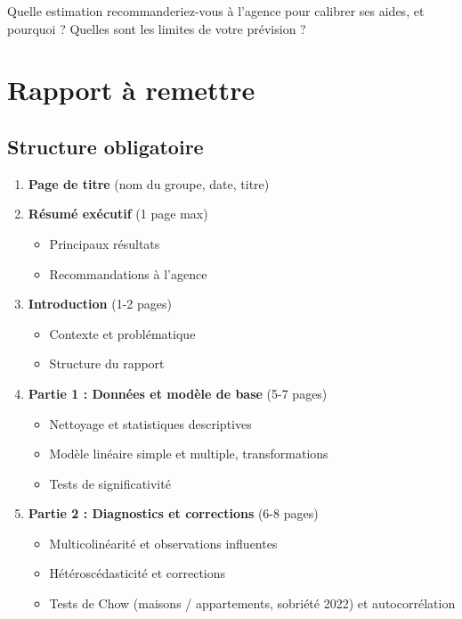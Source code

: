 \documentclass[11pt,a4paper]{article}
\begin{document}
\begin{question}
Quelle estimation recommanderiez-vous à l'agence pour calibrer ses aides, et pourquoi ? Quelles sont les limites de votre prévision ?
\end{question}

\newpage
\section*{Rapport à remettre}

\subsection*{Structure obligatoire}
\begin{enumerate}
  \item \textbf{Page de titre} (nom du groupe, date, titre)
  \item \textbf{Résumé exécutif} (1 page max)
    \begin{itemize}
      \item Principaux résultats
      \item Recommandations à l'agence
    \end{itemize}
  \item \textbf{Introduction} (1-2 pages)
    \begin{itemize}
      \item Contexte et problématique
      \item Structure du rapport
    \end{itemize}
  \item \textbf{Partie 1 : Données et modèle de base} (5-7 pages)
    \begin{itemize}
      \item Nettoyage et statistiques descriptives
      \item Modèle linéaire simple et multiple, transformations
      \item Tests de significativité
    \end{itemize}
  \item \textbf{Partie 2 : Diagnostics et corrections} (6-8 pages)
    \begin{itemize}
      \item Multicolinéarité et observations influentes
      \item Hétéroscédasticité et corrections
      \item Tests de Chow (maisons / appartements, sobriété 2022) et autocorrélation

\end{itemize}
\end{enumerate}
\end{document}
